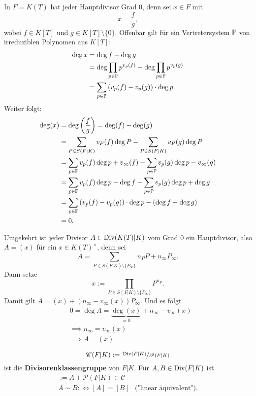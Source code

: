 \begin{beispiel}
    In $F=K(T)$ hat jeder Hauptdivisor Grad $0$, denn sei $x \in F$ mit
    $$ x = \frac{f}{g},$$ 
    wobei $f\in K[T]$ und $g \in K[T]\setminus\{0\}$. Offenbar gilt für ein Vertretersystem $\P$ von irreduziblen Polynomen aus $K[T]$:
    \begin{align*}
        \deg x &= \deg f - \deg g \\
            & = \deg \prod_{p \in \P} p^{v_p(f)} - \deg \prod_{p \in \P} p^{v_p(g)} \\
            & = \sum_{p \in \P} \left(v_p(f) - v_p(g)\right)\cdot \deg p.
    \end{align*}
    Weiter folgt:
    \begin{align*}
        \deg (x) &= \deg \left(\frac{f}{g}\right) = \deg (f) - \deg (g)\\
            &= \sum_{P \in S(F|K)} v_P(f) \deg P - \sum_{P \in S(F|K)} v_P(g) \deg P\\
            &= \sum_{p \in \P} v_p(f)\deg p + v_\infty(f) - \sum_{p \in \P} v_p(g) \deg p - v_\infty(g)\\
            &= \sum_{p \in \P} v_p(f)\deg p - \deg f - \sum_{p \in \P} v_p(g) \deg p + \deg g\\
            &= \sum_{p \in \P} \left(v_p(f) - v_p(g)\right)\cdot\deg p - (\deg f - \deg g)\\
            &= 0.
    \end{align*}

    Umgekehrt ist jeder Divisor $A \in \Div(K(T)|K)$ vom Grad $0$ ein Hauptdivisor, also
    $A = (x)$ für ein $x \in K(T)^{\times}$, denn sei
    $$ A = \sum_{P \in S(F|K) \setminus \{P_\infty\}} n_P P + n_\infty P_\infty. $$
    Dann setze
    $$ x:= \prod_{P \in S(F|K) \setminus \{P_\infty\}} P^{n_P}.$$
    Damit gilt $ A = (x) + (n_\infty - v_\infty(x))P_\infty$. Und es folgt
    \begin{align*}
        &0 = \deg A = \underbrace{\deg (x)}_{=0} + n_\infty - v_\infty(x)\\
        &\implies n_\infty = v_\infty(x)\\
        &\implies A = (x).
    \end{align*}
\end{beispiel}

\begin{definition}
    $$ \mathscr{C}(F|K) := \sfrac{\Div(F|K)}{\mathscr{P}(F|K)}$$
    ist die \textbf{Divisorenklassengruppe} von $F|K$.
    Für $A,B \in \Div(F|K)$ ist
    \begin{align*}
        [A] := A + \mathscr{P}(F|K) \in \mathscr{C}\\
        A \sim B : \iff [A] = [B] & \text{("linear äquivalent")}.
    \end{align*}
\end{definition}

